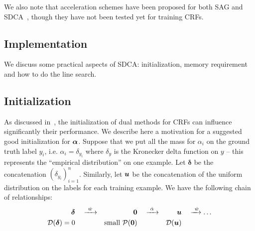 We also note that acceleration schemes have been proposed for both SAG and SDCA~\citep{lin2015catalyst, shalev2016accelerated}, though they have not been tested yet for training CRFs.



\clearpage
\begin{subappendices}

	\section{Implementation} \label{app:sec:implementation}
	We discuss some practical aspects of SDCA: initialization, memory requirement and how to do the line search.

	\subsection{Initialization}\label{app:ssec:initialization}

	As discussed in~\citet{schmidt2015non}, the initialization of dual methods for CRFs can influence significantly their performance.
	We describe here a motivation for a suggested good initialization for $\boldsymbol{\alpha}$.
	Suppose that we put all the mass for $\alpha_i$ on the ground truth label $y_i$, i.e. $\alpha_i = \delta_{y_i}$ where $\delta_y$ is the Kronecker delta function on $y$ -- this represents the ``empirical distribution'' on one example.
	Let $\bm\delta$ be the concatenation $(\delta_{y_i})_{i=1} ^n$.
	Similarly, let $\bm u$ be the concatenation of the uniform distribution on the labels for each training example.
	We have the following chain of relationships:
	\begin{align*}
		\bm\delta & \quad \xrightarrow{~\hat w~} & \bm{0} & \quad \xrightarrow{~\hat \alpha~} & \bm u & \quad \xrightarrow{~\hat w} \dots \\
		{\mathcal D}(\bm\delta)=0 &  & \text{small } {\mathcal P}(\bm{0}) &  & {\mathcal D}(\bm u) &
	\end{align*}


\end{subappendices}
